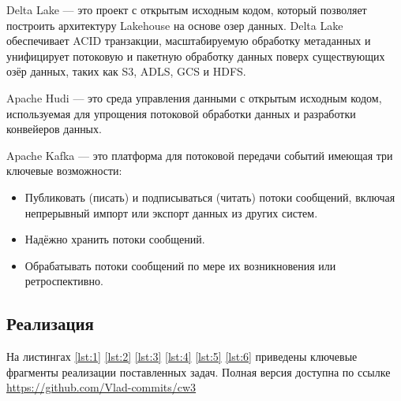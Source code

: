 \documentclass[%
bachelor,    %
subf,        %
href,        %
colorlinks,  %
]{disser}
\begin{document}
Delta Lake --- это проект с открытым исходным кодом, который позволяет построить архитектуру Lakehouse на основе озер данных. Delta Lake обеспечивает ACID транзакции, масштабируемую обработку метаданных и унифицирует потоковую и пакетную обработку данных поверх существующих озёр данных, таких как S3, ADLS, GCS и HDFS.\cite{delta}


Apache Hudi --- это среда управления данными с открытым исходным кодом, используемая для упрощения потоковой обработки данных и разработки конвейеров данных.\cite{hudi}

Apache Kafka --- это платформа для потоковой передачи событий имеющая три ключевые возможности:\cite{kafka}
\begin{itemize}
	\item Публиковать (писать) и подписываться (читать) потоки сообщений, включая непрерывный импорт или экспорт данных из других систем.
	\item Надёжно хранить потоки сообщений.
	\item Обрабатывать потоки сообщений по мере их возникновения или ретроспективно.	
\end{itemize}

\newpage
\subsection{Реализация}
На листингах \ref{lst:1} \ref{lst:2} \ref{lst:3} \ref{lst:4} \ref{lst:5} \ref{lst:6} приведены ключевые фрагменты реализации поставленных задач. Полная версия доступна по ссылке \newline \href{https://github.com/Vlad-commits/cw3}{https://github.com/Vlad-commits/cw3}
\end{document}
